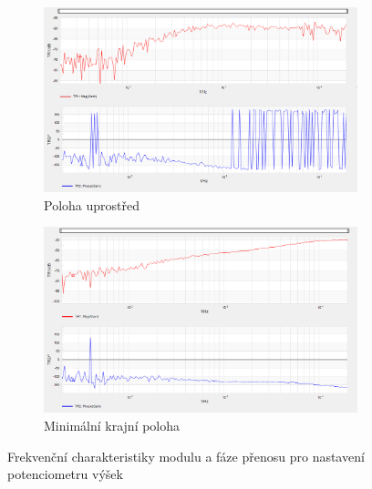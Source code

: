 \documentclass[a4paper, czech]{article}
\begin{document}
\begin{figure}[H]
    \centering
    \begin{subfigure}{0.49\textwidth}
        \includegraphics[width=\textwidth]{nkzt9_2_min_mid_min.png}
        \caption{Poloha uprostřed}
    \end{subfigure}
    \hfill
    \begin{subfigure}{0.49\textwidth}
        \includegraphics[width=\textwidth]{nkzt9_2_min_max_min.png}
        \caption{Minimální krajní poloha}
    \end{subfigure}
    \caption{Frekvenční charakteristiky modulu a fáze přenosu pro nastavení potenciometru výšek} 
\end{figure}
\end{document}
